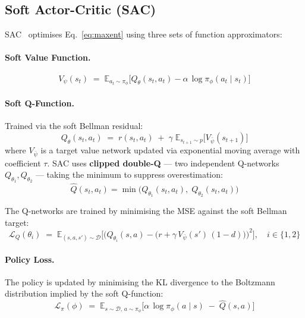 \documentclass[11pt,a4paper]{article}
\begin{document}
\subsection{Soft Actor-Critic (SAC)}

SAC~\cite{haarnoja2018sac} optimises Eq.~\eqref{eq:maxent} using three sets of function approximators:

\paragraph{Soft Value Function.}
\begin{equation}\label{eq:soft-v}
    V_\psi(s_t) \;=\; \mathbb{E}_{a_t \sim \pi_\phi}\!\Big[Q_\theta(s_t, a_t) - \alpha\,\log\pi_\phi(a_t \mid s_t)\Big]
\end{equation}

\paragraph{Soft Q-Function.}  Trained via the soft Bellman residual:
\begin{equation}\label{eq:soft-q}
    Q_\theta(s_t, a_t) \;=\; r(s_t, a_t) \;+\; \gamma\;\mathbb{E}_{s_{t+1}\sim p}\!\Big[V_{\bar\psi}(s_{t+1})\Big]
\end{equation}
where $V_{\bar\psi}$ is a target value network updated via exponential moving average with coefficient $\tau$. SAC uses \textbf{clipped double-Q} — two independent Q-networks $Q_{\theta_1}, Q_{\theta_2}$ — taking the minimum to suppress overestimation:
\begin{equation}
    \hat{Q}(s_t,a_t) = \min\!\big(Q_{\theta_1}(s_t,a_t),\; Q_{\theta_2}(s_t,a_t)\big)
\end{equation}

The Q-networks are trained by minimising the MSE against the soft Bellman target:
\begin{equation}\label{eq:q-loss}
    \mathcal{L}_Q(\theta_i) \;=\; \mathbb{E}_{(s,a,s')\sim\mathcal{D}}\!\bigg[\Big(Q_{\theta_i}(s,a) - \big(r + \gamma\,V_{\bar\psi}(s')\,(1-d)\big)\Big)^{\!2}\bigg], \quad i\in\{1,2\}
\end{equation}

\paragraph{Policy Loss.}  The policy is updated by minimising the KL divergence to the Boltzmann distribution implied by the soft Q-function:
\begin{equation}\label{eq:policy-loss}
    \mathcal{L}_\pi(\phi) \;=\; \mathbb{E}_{s\sim\mathcal{D},\,a\sim\pi_\phi}\!\Big[\alpha\,\log\pi_\phi(a\mid s) \;-\; \hat{Q}(s,a)\Big]
\end{equation}
\end{document}
